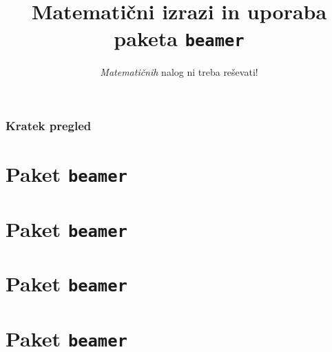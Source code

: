 \documentclass{beamer}
\begin{document}
\title{Matematični izrazi in uporaba paketa \texttt{beamer}}
\subtitle{\emph{Matematičnih} nalog ni treba reševati!}
\date{} %

\frame{\titlepage}
\begin{frame}
    \frametitle{Kratek pregled}
    \tableofcontents%
\end{frame}

\section{Paket \texttt{beamer}}


\section{Paket \texttt{beamer}}


\section{Paket \texttt{beamer}}


\section{Paket \texttt{beamer}}
\end{document}
